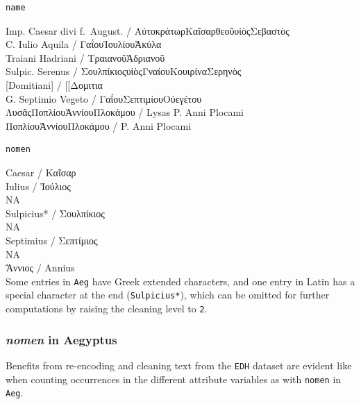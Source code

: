 \documentclass[a4paper,11pt]{memoir}
\newenvironment{Shaded}{\begin{snugshade}}{\end{snugshade}}
\newcommand{\CommentTok}[1]{\textcolor[rgb]{0.56,0.35,0.01}{\textit{#1}}}
\newcommand{\DataTypeTok}[1]{\textcolor[rgb]{0.13,0.29,0.53}{#1}}
\newcommand{\ErrorTok}[1]{\textcolor[rgb]{0.64,0.00,0.00}{\textbf{#1}}}
\newcommand{\KeywordTok}[1]{\textcolor[rgb]{0.13,0.29,0.53}{\textbf{#1}}}
\newcommand{\NormalTok}[1]{#1}
\newcommand{\OperatorTok}[1]{\textcolor[rgb]{0.81,0.36,0.00}{\textbf{#1}}}
\newcommand{\OtherTok}[1]{\textcolor[rgb]{0.56,0.35,0.01}{#1}}
\newcommand{\StringTok}[1]{\textcolor[rgb]{0.31,0.60,0.02}{#1}}
\begin{document}
\begin{verbatim}
name
\end{verbatim}

\noindent
Imp. Caesar divi f.~August. / ΑὐτοκράτωρΚαῖσαρθεοῦυἱὸςΣεβαστὸς \\
C. Iulio Aquila / ΓαΐουἸουλίουἈκύλα \\
Traiani Hadriani / ΤραιανοῦἉδριανοῦ \\
Sulpic. Serenus / ΣουλπίκιοςυἱὸςΓναίουΚουιρίναΣερηνὸς \\
{[}Domitiani{]} / {[}{[}Δομιτια \\
G. Septimio Vegeto / ΓαΐουΣεπτιμίουΟὐεγέτου\\
ΛυσᾶςΠοπλίουἈννίουΠλοκάμου / Lysas P. Anni Plocami \\
ΠοπλίουἈννίουΠλοκάμου / P. Anni Plocami\\

\begin{verbatim}
nomen
\end{verbatim}

\noindent
Caesar / Καῖσαρ \\
Iulius / Ἰούλιος \\
NA \\
Sulpicius* / Σουλπίκιος \\
NA \\
Septimius / Σεπτίμιος \\
NA \\
Ἄννιος / Annius\\

Some entries in \texttt{Aeg} have Greek extended characters, and one
entry in Latin has a special character at the end (\texttt{Sulpicius*}),
which can be omitted for further computations by raising the cleaning
level to \texttt{2}.

\hypertarget{nomen-in-aegyptus}{%
\subsubsection{\texorpdfstring{\emph{nomen} in
Aegyptus}{nomen in Aegyptus}}\label{nomen-in-aegyptus}}

Benefits from re-encoding and cleaning text from the \texttt{EDH}
dataset are evident like when counting occurrences in the different
attribute variables as with \texttt{nomen} in \texttt{Aeg}.

\begin{Shaded}
\end{Shaded}
\end{document}

